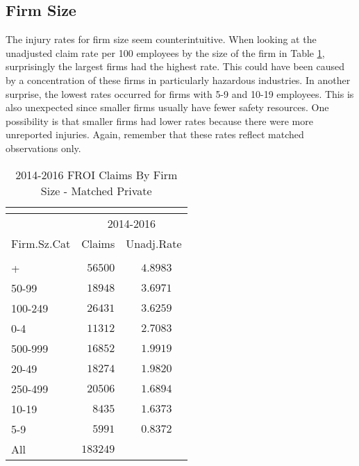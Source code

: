 \documentclass[9pt, oneside]{article}   	%
\begin{document}
      
\subsection{Firm Size}

The injury rates for firm size seem counterintuitive. When looking at the unadjusted claim rate per 100 employees by the size of the firm in Table \ref{Table: table12}, surprisingly the largest firms had the highest rate. This could have been caused by a concentration of these firms in particularly hazardous industries. In another surprise, the lowest rates occurred for firms with 5-9 and 10-19 employees. This is also unexpected since smaller firms usually have fewer safety resources. One possibility is that smaller firms had lower rates because there were more unreported injuries. Again, remember that these rates reflect matched observations only.

\begin{longtable}{lcc}
\caption{2014-2016 FROI Claims By Firm Size - Matched Private}\\ 
\label{Table: table12} \\
\hline
                  \toprule
 & \multicolumn{2}{c}{2014-2016} \\ 
Firm.Sz.Cat  & Claims & \multicolumn{1}{c}{Unadj.Rate} \\ 
\midrule\\ [-1\normalbaselineskip]\hline\endhead\hline\endfoot
1000+  & $\phantom{0}56500$ & $\phantom{0}4.8983$ \\
50-99  & $\phantom{0}18948$ & $\phantom{0}3.6971$ \\
100-249  & $\phantom{0}26431$ & $\phantom{0}3.6259$ \\
0-4  & $\phantom{0}11312$ & $\phantom{0}2.7083$ \\
500-999  & $\phantom{0}16852$ & $\phantom{0}1.9919$ \\
20-49  & $\phantom{0}18274$ & $\phantom{0}1.9820$ \\
250-499  & $\phantom{0}20506$ & $\phantom{0}1.6894$ \\
10-19  & $\phantom{00}8435$ & $\phantom{0}1.6373$ \\
5-9  & $\phantom{00}5991$ & $\phantom{0}0.8372$ \\
\cline{1-1} \cline{2-2} \cline{3-3}  %
All  & $183249$ &  \\
\hline 
\end{longtable}
\end{document}
